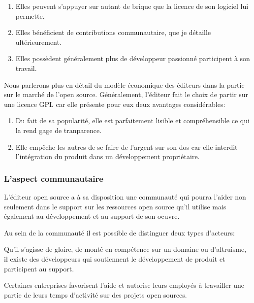 				\begin{enumerate}[font=\color{burntorange}]
		 			\item Elles peuvent s'appuyer sur autant de brique que la licence de son logiciel lui permette.
		 			\item Elles bénéficient de contributions communautaire, que je détaille ultérieurement.
			 		\item Elles possèdent généralement plus de développeur passionné participent à son travail.
				\end{enumerate}

				Nous parlerons plus en détail du modèle économique des éditeurs dans la partie sur le marché de l'open source.
				Généralement, l'éditeur fait le choix de partir sur une licence GPL car elle présente pour eux deux avantages considérables:


				\begin{enumerate}[font=\color{burntorange}]
		 			\item Du fait de sa popularité, elle est parfaitement lisible et compréhensible ce qui la rend gage de tranparence.
		 			\item Elle empêche les autres de se faire de l'argent sur son dos car elle interdit l'intégration du produit dans un développement propriétaire.
				\end{enumerate}

			\subsubsection{L'aspect communautaire}

				L'éditeur open source a à sa disposition une communauté qui pourra l'aider non seulement dans le support sur les ressources open source qu'il utilise mais également au développement et au support de son oeuvre.

				Au sein de la communauté il est possible de distinguer deux types d'acteurs:

				\begin{description}[font=\color{burntorange}]
					\item[les développeurs indépendants: ] Qu'il s'agisse de gloire, de monté en compétence sur un domaine ou d'altruisme, il existe des développeurs qui soutiennent le développement de produit et participent au support.
					\item[Les contributeurs et entreprises contributrices: ] Certaines entreprises favorisent l'aide et autorise leurs employés à travailler une partie de leurs temps d'activité sur des projets open sources.
				\end{description}

